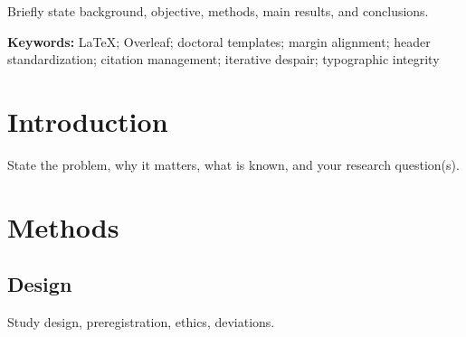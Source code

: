 
\begin{chapterabstractpage}
  Briefly state background, objective, methods, main results, and conclusions.

  \bigskip
  \textbf{Keywords:} LaTeX; Overleaf; doctoral templates; margin alignment; header standardization; citation management; iterative despair; typographic integrity
\end{chapterabstractpage}



\section{Introduction}
State the problem, why it matters, what is known, and your research question(s).


\section{Methods}

\subsection{Design}
Study design, preregistration, ethics, deviations.

